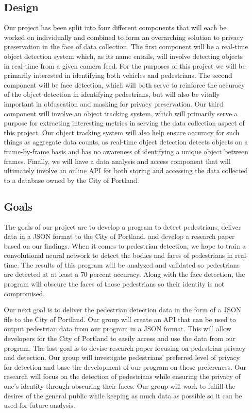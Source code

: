 \documentclass[onecolumn, draftclsnofoot,10pt, compsoc]{IEEEtran}
\begin{document}
\subsection{Design}
Our project has been split into four different components that will each be worked on individually and combined to form an overarching solution to privacy preservation in the face of data collection. The first component will be a real-time object detection system which, as its name entails, will involve detecting objects in real-time from a given camera feed. For the purposes of this project we will be primarily interested in identifying both vehicles and pedestrians. The second component will be face detection, which will both serve to reinforce the accuracy of the object detection in identifying pedestrians, but will also be vitally important in obfuscation and masking for privacy preservation. Our third component will involve an object tracking system, which will primarily serve a purpose for extracting interesting metrics in serving the data collection aspect of this project. Our object tracking system will also help ensure accuracy for such things as aggregate data counts, as real-time object detection detects objects on a frame-by-frame basis and has no awareness of identifying a unique object between frames. Finally, we will have a data analysis and access component that will ultimately involve an online API for both storing and accessing the data collected to a database owned by the City of Portland.

\subsection{Goals}
The goals of our project are to develop a program to detect pedestrians, deliver data in a JSON format to the City of Portland, and develop a research paper based on our findings. When it comes to pedestrian detection, we hope to train a convolutional neural network to detect the bodies and faces of pedestrians in real-time. The results of this program will be analyzed and validated so pedestrians are detected at at least a 70 percent accuracy. Along with the face detection, the program will obscure the faces of those pedestrians so their identity is not compromised. 

Our next goal is to deliver the pedestrian detection data in the form of a JSON file to the City of Portland. Our group will create an API that can be used to output pedestrian data from our program in a JSON format. This will allow developers for the City of Portland to easily access and use the data from our program. The last goal is to devise research paper focusing on pedestrian privacy and detection. Our group will investigate pedestrians’ preferred level of privacy for detection and base the development of our program on those preferences. Our research will focus on the detection of pedestrians while ensuring the privacy of one’s identity through obscuring their faces. Our group will work to fulfill the desires of the general public while keeping as much data as possible so it can be used for future analysis. 
\end{document}
